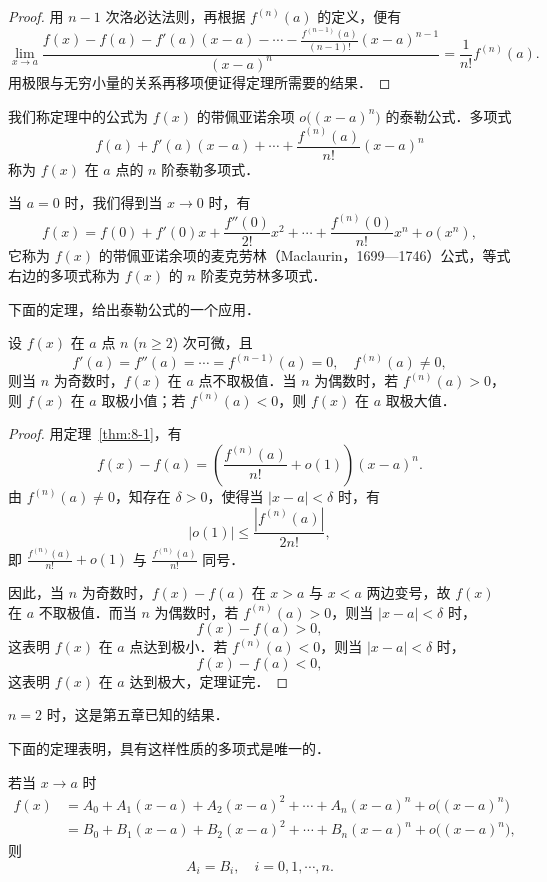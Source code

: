 \begin{proof}
用 $n-1$ 次洛必达法则，再根据 $f^{(n)}(a)$ 的定义，便有
\[
\lim_{x\to a}\frac{f(x) - f(a) - f'(a)(x-a) - \cdots - \frac{f^{(n-1)}(a)}{(n-1)!}(x-a)^{n-1}}{(x-a)^n} = \frac{1}{n!}f^{(n)}(a).
\]
用极限与无穷小量的关系再移项便证得定理所需要的结果．
\end{proof}

我们称定理中的公式为 $f(x)$ 的带佩亚诺余项 $o\big((x-a)^n\big)$ 的泰勒公式．多项式
\[
f(a) + f'(a)(x-a) + \cdots + \frac{f^{(n)}(a)}{n!}(x-a)^n
\]
称为 $f(x)$ 在 $a$ 点的 $n$ 阶泰勒多项式．

当 $a = 0$ 时，我们得到当 $x \to 0$ 时，有
\[
f(x) = f(0) + f'(0)x + \frac{f''(0)}{2!}x^2 + \cdots + \frac{f^{(n)}(0)}{n!}x^n + o(x^n),
\]
它称为 $f(x)$ 的带佩亚诺余项的麦克劳林（Maclaurin，1699---1746）公式，等式右边的多项式称为 $f(x)$ 的 $n$ 阶麦克劳林多项式．

下面的定理，给出泰勒公式的一个应用．

\begin{theorem}\label{thm:8-2}
设 $f(x)$ 在 $a$ 点 $n$ ($n \geqslant 2$) 次可微，且
\[
f'(a) = f''(a) = \cdots = f^{(n-1)}(a) = 0, \quad f^{(n)}(a) \neq 0,
\]
则当 $n$ 为奇数时，$f(x)$ 在 $a$ 点不取极值．当 $n$ 为偶数时，若 $f^{(n)}(a) > 0$，则 $f(x)$ 在 $a$ 取极小值；若 $f^{(n)}(a) < 0$，则 $f(x)$ 在 $a$ 取极大值．
\end{theorem}

\begin{proof}
用定理~\ref{thm:8-1}，有
\[
f(x) - f(a) = \left(\frac{f^{(n)}(a)}{n!} + o(1)\right)(x-a)^n.
\]
由 $f^{(n)}(a) \neq 0$，知存在 $\delta > 0$，使得当 $|x - a| < \delta$ 时，有
\[
|o(1)| \leqslant \frac{|f^{(n)}(a)|}{2n!},
\]
即 $\frac{f^{(n)}(a)}{n!} + o(1)$ 与 $\frac{f^{(n)}(a)}{n!}$ 同号．

因此，当 $n$ 为奇数时，$f(x) - f(a)$ 在 $x > a$ 与 $x < a$ 两边变号，故 $f(x)$ 在 $a$ 不取极值．而当 $n$ 为偶数时，若 $f^{(n)}(a) > 0$，则当 $|x - a| < \delta$ 时，
\[
f(x) - f(a) > 0,
\]
这表明 $f(x)$ 在 $a$ 点达到极小．若 $f^{(n)}(a) < 0$，则当 $|x - a| < \delta$ 时，
\[
f(x) - f(a) < 0,
\]
这表明 $f(x)$ 在 $a$ 达到极大，定理证完．
\end{proof}

$n = 2$ 时，这是第五章已知的结果．

下面的定理表明，具有这样性质的多项式是唯一的．

\begin{theorem}[唯一性]\label{thm:8-3}
若当 $x \to a$ 时
\begin{align*}
f(x) &= A_0 + A_1(x-a) + A_2(x-a)^2 + \cdots + A_n(x-a)^n + o\big((x-a)^n\big) \\
&= B_0 + B_1(x-a) + B_2(x-a)^2 + \cdots + B_n(x-a)^n + o\big((x-a)^n\big),
\end{align*}
则
\[
A_i = B_i, \quad i = 0, 1, \cdots, n.
\]
\end{theorem}

